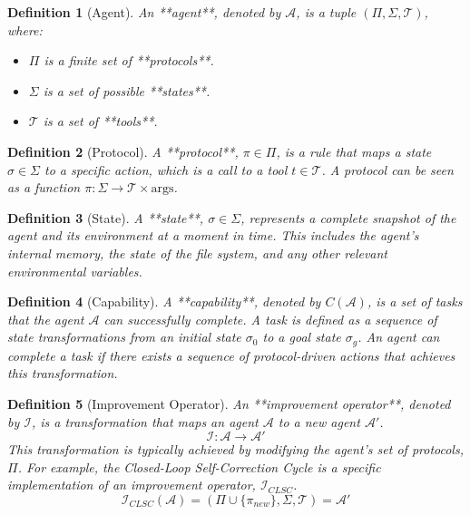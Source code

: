 \documentclass{article}
\newtheorem{definition}{Definition}
\begin{document}
\begin{definition}[Agent]
An **agent**, denoted by $\mathcal{A}$, is a tuple $(\Pi, \Sigma, \mathcal{T})$, where:
\begin{itemize}
    \item $\Pi$ is a finite set of **protocols**.
    \item $\Sigma$ is a set of possible **states**.
    \item $\mathcal{T}$ is a set of **tools**.
\end{itemize}
\end{definition}

\begin{definition}[Protocol]
A **protocol**, $\pi \in \Pi$, is a rule that maps a state $\sigma \in \Sigma$ to a specific action, which is a call to a tool $t \in \mathcal{T}$. A protocol can be seen as a function $\pi: \Sigma \to \mathcal{T} \times \text{args}$.
\end{definition}

\begin{definition}[State]
A **state**, $\sigma \in \Sigma$, represents a complete snapshot of the agent and its environment at a moment in time. This includes the agent's internal memory, the state of the file system, and any other relevant environmental variables.
\end{definition}

\begin{definition}[Capability]
A **capability**, denoted by $C(\mathcal{A})$, is a set of tasks that the agent $\mathcal{A}$ can successfully complete. A task is defined as a sequence of state transformations from an initial state $\sigma_0$ to a goal state $\sigma_g$. An agent can complete a task if there exists a sequence of protocol-driven actions that achieves this transformation.
\end{definition}

\begin{definition}[Improvement Operator]
An **improvement operator**, denoted by $\mathcal{I}$, is a transformation that maps an agent $\mathcal{A}$ to a new agent $\mathcal{A}'$.
$$ \mathcal{I}: \mathcal{A} \to \mathcal{A}' $$
This transformation is typically achieved by modifying the agent's set of protocols, $\Pi$. For example, the Closed-Loop Self-Correction Cycle is a specific implementation of an improvement operator, $\mathcal{I}_{CLSC}$.
$$ \mathcal{I}_{CLSC}(\mathcal{A}) = (\Pi \cup \{\pi_{new}\}, \Sigma, \mathcal{T}) = \mathcal{A}' $$
\end{definition}
\end{document}

